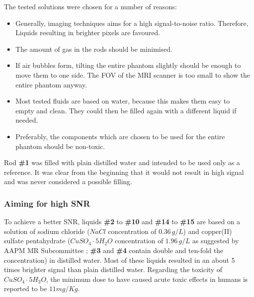 The tested solutions were chosen for a number of reasons:
\begin{itemize}
\item Generally, imaging techniques aims for a high signal-to-noise ratio. Therefore, Liquids resulting in brighter pixels are favoured.
\item The amount of gas in the rods should be minimised.
\item If air bubbles form, tilting the entire phantom slightly should be enough to move them to one side. The FOV of the MRI scanner is too small to show the entire phantom anyway.
\item Most tested fluids are based on water, because this makes them easy to empty and clean.
They could then be filled again with a different liquid if needed.
\item Preferably, the components which are chosen to be used for the entire phantom should be non-toxic.
\end{itemize}

\vspace{1cm}

Rod \textbf{\#1} was filled with plain distilled water and intended to be used only as a reference.
It was clear from the beginning that it would not result in high signal and was never considered a possible filling.

\subsubsection{Aiming for high SNR}
To achieve a better SNR, liquids \textbf{\#2} to \textbf{\#10} and \textbf{\#14} to \textbf{\#15} are based on a solution of sodium chloride ($NaCl$ concentration of $0.36 \, g/L$) and copper(II) sulfate pentahydrate ($CuSO_4\cdot5H_2O$ concentration of $1.96 \, g/L$ as suggested by AAPM MR Subcommittee \cite{Jackson2009};  \textbf{\#3} and \textbf{\#4} contain double and ten-fold the concentration) in distilled water.
Most of these liquids resulted in an about 5 times brighter signal than plain distilled water.
Regarding the toxicity of $CuSO_4\cdot5H_2O$, the minimum dose to have caused acute toxic effects in humans is reported to be $11 mg/Kg$.

